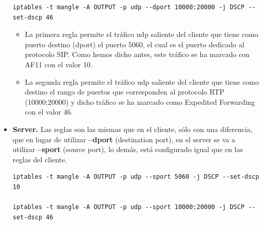 \documentclass[11pt]{article}
\begin{document}
\begin{itemize}
\begin{lstlisting}[style=C,numbers=none]
iptables -t mangle -A OUTPUT -p udp --dport 10000:20000 -j DSCP --set-dscp 46
\end{lstlisting}
\begin{itemize}

\item La primera regla permite el tráfico udp saliente del cliente que tiene como puerto destino (dport) el puerto 5060, el cual es el puerto dedicado al protocolo SIP. Como hemos dicho antes, este tráfico se ha marcado con AF11 con el valor 10.

\item La segunda regla permite el tráfico udp saliente del cliente que tiene como destino el rango de puertos que corresponden al protocolo RTP (10000:20000) y dicho tráfico se ha marcado como Expedited Forwarding con el valor 46.
\end{itemize}

\item \textbf{Server.}
Las reglas son las mismas que en el cliente, sólo con una diferencia, que en lugar de utilizar \textbf{--dport} (destination port), en el server se va a utilizar \textbf{--sport} (source port), lo demás, está configurado igual que en las reglas del cliente.
\begin{lstlisting}[style=C,numbers=none]
iptables -t mangle -A OUTPUT -p udp --sport 5060 -j DSCP --set-dscp 10

iptables -t mangle -A OUTPUT -p udp --sport 10000:20000 -j DSCP --set-dscp 46
\end{lstlisting}

\end{itemize}
\end{document}
